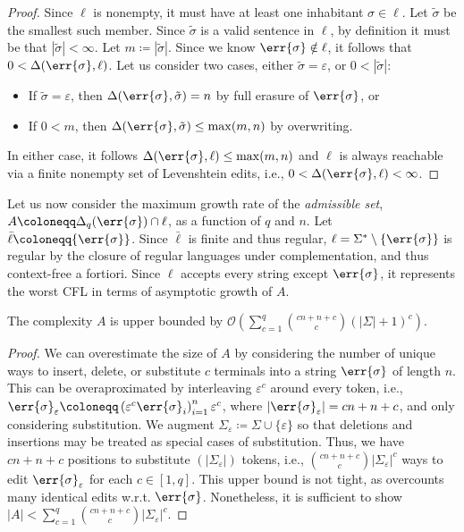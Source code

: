 \documentclass[runningheads]{llncs}
\begin{document}
\begin{proof}
  Since $\ell$ is nonempty, it must have at least one inhabitant $\sigma \in \ell$. Let $\tilde{\sigma}$ be the smallest such member. Since $\tilde{\sigma}$ is a valid sentence in $\ell$, by definition it must be that $|\tilde{\sigma}|<\infty$. Let $m\coloneqq|\tilde{\sigma}|$. Since we know $\err{\sigma} \notin \ell$, it follows that $0 < \Delta(\err{\sigma}, \ell)$. Let us consider two cases, either $\tilde{\sigma} = \varepsilon$, or $0 < |\tilde{\sigma}|$:

  \begin{itemize}
    \item If $\tilde{\sigma} = \varepsilon$, then $\Delta(\err{\sigma}, \tilde{\sigma}) = n$ by full erasure of $\err{\sigma}$, or
    \item If $0 < m$, then $\Delta(\err{\sigma}, \tilde{\sigma}) \leq \max(m, n)$ by overwriting.
  \end{itemize}

  In either case, it follows $\Delta(\err{\sigma}, \ell) \leq \max(m, n)$ and $\ell$ is always reachable via a finite nonempty set of Levenshtein edits, i.e., $0 < \Delta(\err{\sigma}, \ell) < \infty$.
\end{proof}

Let us now consider the maximum growth rate of the \textit{admissible set}, $A \coloneqq \Delta_q(\err{\sigma}) \cap \ell$, as a function of $q$ and $n$. Let $\bar\ell \coloneqq \{\err{\sigma}\}$. Since $\bar\ell$ is finite and thus regular, $\ell = \Sigma^* \setminus \{\err{\sigma}\}$ is regular by the closure of regular languages under complementation, and thus context-free a fortiori. Since $\ell$ accepts every string except $\err{\sigma}$, it represents the worst CFL in terms of asymptotic growth of $A$.

\begin{lemma}\label{lemma:interleaving}
The complexity $A$ is upper bounded by $\mathcal{O}\left(\sum_{c=1}^q{{cn + n + c} \choose c}(|\Sigma| + 1)^c\right)$.
\end{lemma}

\begin{proof}
  We can overestimate the size of $A$ by considering the number of unique ways to insert, delete, or substitute $c$ terminals into a string $\err{\sigma}$ of length $n$. This can be overaproximated by interleaving $\varepsilon^c$ around every token, i.e., $\err{\sigma}_\varepsilon\coloneqq \left(\varepsilon^c\err{\sigma}_i\right)_{i=1}^n\varepsilon^c$, where $|\err{\sigma}_\varepsilon| = cn + n + c$, and only considering substitution. We augment $\Sigma_\varepsilon \coloneqq \Sigma \cup \{\varepsilon\}$ so that deletions and insertions may be treated as special cases of substitution. Thus, we have $cn + n + c$ positions to substitute $(|\Sigma_\varepsilon|)$ tokens, i.e., ${{cn + n + c} \choose c}|\Sigma_\varepsilon|^c$ ways to edit $\err{\sigma}_\varepsilon$ for each $c \in [1, q]$. This upper bound is not tight, as overcounts many identical edits w.r.t. $\err{\sigma}$. Nonetheless, it is sufficient to show $|A| < \sum_{c=1}^q{{cn + n + c} \choose c}|\Sigma_\varepsilon|^c$.
\end{proof}
\end{document}
